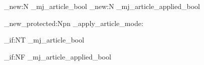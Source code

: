 \ExplSyntaxOn

\bool_new:N \g_mj_article_bool
\bool_new:N \g_mj_article_applied_bool

\cs_new_protected:Npn \mathjestic_apply_article_mode:
  {
    \bool_if:NT \g_mj_article_bool
      {
        \bool_if:NF \g_mj_article_applied_bool
          {
            \renewcommand\thesection{\arabic{section}}
            \renewcommand\thesubsection{\thesection.\arabic{subsection}}
            \renewcommand\thesubsubsection{\thesubsection.\arabic{subsubsection}}

            \makeatletter
            \makeatother
            \renewcommand\thefigure{\thesection.\arabic{figure}}
            \renewcommand\thetable{\thesection.\arabic{table}}

            \setcounter{secnumdepth}{3}
            \setcounter{tocdepth}{2}

}}}
